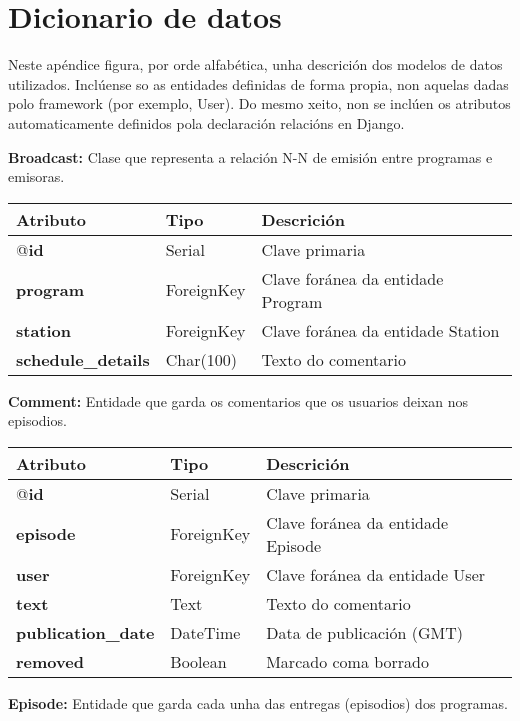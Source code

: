 \chapter[Apéndice]{
  \label{chp:dicionario}
  Dicionario de datos
}
Neste apéndice figura, por orde alfabética, unha descrición dos modelos de datos utilizados. Inclúense so as entidades definidas de forma propia, non aquelas dadas polo framework (por exemplo, User). Do mesmo xeito, non se inclúen os atributos automaticamente definidos pola declaración relacións en Django. 

\textbf{Broadcast:} Clase que representa a relación N-N de emisión entre programas e emisoras.

\begin{longtable}{|p{3cm}|p{3cm}|p{8cm}|}
	\hline
	\rowcolor{gray!50}
	Atributo & Tipo & Descrición\\
	\hline
	@\textbf{id} & Serial & Clave primaria\\
	\hline
	\textbf{program} & ForeignKey & Clave foránea da entidade Program\\
	\hline
	\textbf{station} & ForeignKey & Clave foránea da entidade Station\\	
	\hline
	\textbf{schedule\_details} & Char(100) & Texto do comentario\\
	\hline
\end{longtable}


\textbf{Comment:} Entidade que garda os comentarios que os usuarios deixan nos episodios.

\begin{longtable}{|p{3cm}|p{3cm}|p{8cm}|}
	\hline
	\rowcolor{gray!50}
	Atributo & Tipo & Descrición\\
	\hline
	@\textbf{id} & Serial & Clave primaria\\
	\hline
	\textbf{episode} & ForeignKey & Clave foránea da entidade Episode\\
	\hline
	\textbf{user} & ForeignKey & Clave foránea da entidade User\\	
	\hline
	\textbf{text} & Text & Texto do comentario\\
	\hline
	\textbf{publication\_date} & DateTime & Data de publicación (GMT)\\
	\hline
	\textbf{removed} & Boolean & Marcado coma borrado\\
	\hline
\end{longtable}



\textbf{Episode:} Entidade que garda cada unha das entregas (episodios) dos programas.

